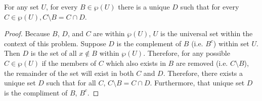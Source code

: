 
\begin{theorem}
  For any set $U$, for every $B\in \wp(U)$ there is a unique $D$ such that for
  every $C \in \wp(U), C \setminus B = C \cap D$.
\end{theorem}

\begin{proof}
  Because $B$, $D$, and $C$ are within $\wp(U)$, $U$ is the universal set
  within the context of this problem. Suppose $D$ is the complement of $B$
  (i.e. $B^c$) within set $U$. Then $D$ is the set of all $x \notin B$ within
  $\wp(U)$. Therefore, for any possible $C \in \wp(U)$ if the members of $C$
  which also exists in $B$ are removed (i.e. $C \setminus B$), the remainder
  of the set will exist in both $C$ and $D$. Therefore, there exists a unique
  set $D$ such that for all $C$, $C \setminus B = C \cap D$. Furthermore, that
  unique set $D$ is the compliment of $B$, $B^c$.
\end{proof}
